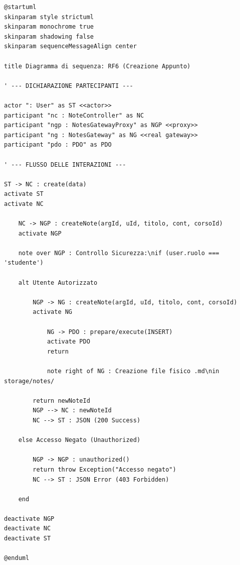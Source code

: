 \begin{verbatim}
@startuml
skinparam style strictuml
skinparam monochrome true
skinparam shadowing false
skinparam sequenceMessageAlign center

title Diagramma di sequenza: RF6 (Creazione Appunto)

' --- DICHIARAZIONE PARTECIPANTI ---

actor ": User" as ST <<actor>>
participant "nc : NoteController" as NC
participant "ngp : NotesGatewayProxy" as NGP <<proxy>>
participant "ng : NotesGateway" as NG <<real gateway>>
participant "pdo : PDO" as PDO

' --- FLUSSO DELLE INTERAZIONI ---

ST -> NC : create(data)
activate ST
activate NC

    NC -> NGP : createNote(argId, uId, titolo, cont, corsoId)
    activate NGP
    
    note over NGP : Controllo Sicurezza:\nif (user.ruolo === 'studente')
    
    alt Utente Autorizzato
        
        NGP -> NG : createNote(argId, uId, titolo, cont, corsoId)
        activate NG
            
            NG -> PDO : prepare/execute(INSERT)
            activate PDO
            return
            
            note right of NG : Creazione file fisico .md\nin storage/notes/
            
        return newNoteId
        NGP --> NC : newNoteId
        NC --> ST : JSON (200 Success)

    else Accesso Negato (Unauthorized)
        
        NGP -> NGP : unauthorized()
        return throw Exception("Accesso negato")
        NC --> ST : JSON Error (403 Forbidden)
        
    end

deactivate NGP
deactivate NC
deactivate ST

@enduml
\end{verbatim}